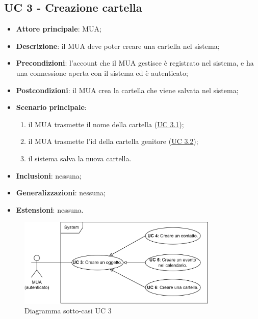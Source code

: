 \subsection{UC 3 - Creazione cartella} \label{sec:UC3}
    \begin{itemize}
        \item \textbf{Attore principale}: MUA;
        \item \textbf{Descrizione}: il MUA deve poter creare una cartella nel sistema;
        \item \textbf{Precondizioni}: l’account che il MUA gestisce è registrato nel sistema, e ha una connessione aperta con il sistema ed è autenticato;
        \item \textbf{Postcondizioni}: il MUA crea la cartella che viene salvata nel sistema;
        \item \textbf{Scenario principale}:
            \begin{enumerate}
                \item il MUA trasmette il nome della cartella (\hyperref[sec:UC3.1]{UC 3.1});
                \item il MUA trasmette l'id della cartella genitore (\hyperref[sec:UC3.2]{UC 3.2});
                \item il sistema salva la nuova cartella.
            \end{enumerate}
        \item \textbf{Inclusioni}: nessuna;
        \item \textbf{Generalizzazioni}: nessuna;
        \item \textbf{Estensioni}: nessuna.
    \end{itemize}

\begin{figure}[H]
    \includegraphics[width=0.85\textwidth]{sections/uc_imgs/UC03.png}
    \centering
    \caption{Diagramma sotto-casi UC 3}
\end{figure}

